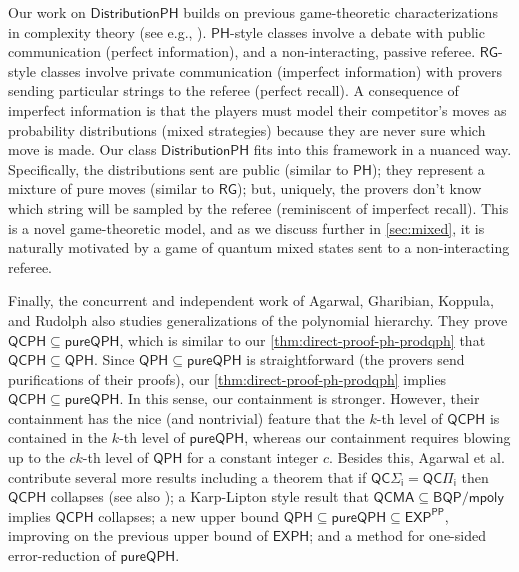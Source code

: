 \documentclass[11pt]{article}
\theoremstyle{definition}
\newcommand{\class}[1]{\ensuremath{\mathsf{#1}}\xspace}
\newcommand{\EXP}{\class{EXP}}
\newcommand{\QCMA}{\class{QCMA}}
\newcommand{\RG}{\class{RG}}
\newcommand{\PP}{\class{PP}}
\newcommand{\EXPH}{\class{EXPH}}
\newcommand{\PH}{\class{PH}}
\newcommand{\QCPH}{\class{QCPH}}
\newcommand{\QCSigmai}[1][i]{\class{QC\Sigma_{#1}}}
\newcommand{\QCPii}[1][i]{\class{QC\Pi_{#1}}}
\newcommand{\QPH}{\class{QPH}}
\newcommand{\pureQPH}{\class{pureQPH}}
\newcommand{\distributionPH}{\mixedPH}
\newcommand{\mixedPH}{\class{DistributionPH}}
\begin{document}
Our work on $\distributionPH$ builds on previous game-theoretic characterizations in complexity theory (see e.g., \cite{feigenbaum1995game}).
$\PH$-style classes involve a debate with public communication (perfect information), and a non-interacting, passive referee.
$\RG$-style classes involve private communication (imperfect information) with provers sending particular strings to the referee (perfect recall).
A consequence of imperfect information is that the players must model their competitor's moves as probability distributions (mixed strategies) because they are never sure which move is made.
Our class $\distributionPH$ fits into this framework in a nuanced way.
Specifically, the distributions sent are public (similar to $\PH$); they represent a mixture of pure moves (similar to $\RG$); but, uniquely, the provers don't know which string will be sampled by the referee (reminiscent of imperfect recall). 
This is a novel game-theoretic model, and as we discuss further in \cref{sec:mixed}, it is naturally motivated by a game of quantum mixed states sent to a non-interacting referee.



Finally, the concurrent and independent work of Agarwal, Gharibian, Koppula, and Rudolph \cite{agarwal2023quantum} also studies generalizations of the polynomial hierarchy.
They prove $\QCPH \subseteq \pureQPH$, which is similar to our \cref{thm:direct-proof-ph-prodqph} that $\QCPH \subseteq \QPH$.
Since $\QPH\subseteq \pureQPH$ is straightforward (the provers send purifications of their proofs), our \cref{thm:direct-proof-ph-prodqph} implies $\QCPH\subseteq \pureQPH$.
In this sense, our containment is stronger.
However, their containment has the nice (and nontrivial) feature that the $k$-th level of $\QCPH$ is contained in the $k$-th level of $\pureQPH$, whereas our containment requires blowing up to the $ck$-th level of $\QPH$ for a constant integer $c$. 
Besides this,
Agarwal et al. contribute several more results including a theorem that if $\QCSigmai=\QCPii$ then $\QCPH$ collapses (see also \cite{falor2023collapsible}); a Karp-Lipton style result that $\QCMA \subseteq \class{BQP/mpoly}$ implies $\QCPH$ collapses; a new upper bound $\QPH\subseteq \pureQPH \subseteq \EXP^{\PP}$, improving on the previous upper bound of $\EXPH$; and a method for one-sided error-reduction of $\pureQPH$.
\end{document}
